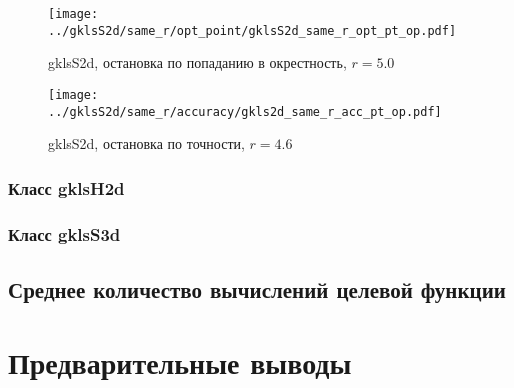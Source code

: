 \documentclass[a4paper]{article}
\begin{document}
\begin{figure}[H]
  \center
  \texttt{[image: ../gklsS2d/same\_r/opt\_point/gklsS2d\_same\_r\_opt\_pt\_op.pdf]}
  \caption{gklsS2d, остановка по попаданию в окрестность, $r=5.0$}
  \label{fig:}
\end{figure}

\begin{figure}[H]
  \center
  \texttt{[image: ../gklsS2d/same\_r/accuracy/gkls2d\_same\_r\_acc\_pt\_op.pdf]}
  \caption{gklsS2d, остановка по точности, $r=4.6$}
  \label{fig:}
\end{figure}

\subsubsection{Класс gklsH2d}



\subsubsection{Класс gklsS3d}

\subsection{Среднее количество вычислений целевой функции}

\section{Предварительные выводы}
\end{document}
